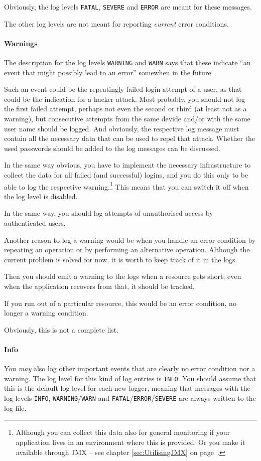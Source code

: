 \documentclass[11pt,a4paper, titlepage, parskip=half, headsepline, footsepline, cleardoublepage=current, headheight=1cm]{scrbook}
\newcommand*{\tqvref}[1]{\hyperref[{#1}]{\ref*{#1}} on page~\pageref{#1}}
\begin{document}
Obviously, the log levels \verb#FATAL#, \verb#SEVERE# and \verb#ERROR# are meant for these messages.

The other log levels are not meant for reporting \textit{current} error conditions.

\paragraph{Warnings} The description for the log levels \verb#WARNING# and \verb#WARN# says that these indicate “an event that might possibly lead to an error” somewhen in the future.

Such an event could be the repeatingly failed login attempt of a user, as that could be the indication for a hacker attack. Most probably, you should not log the first failed attempt, perhaps not even the second or third (at least not as a warning), but consecutive attempts from the same devide and/or with the same user name should be logged. And obviously, the respective log message must contain all the necessary data that can be used to repel that attack. Whether the used passwords should be added to the log messages can be discussed.

In the same way obvious, you have to implement the necessary infrastructure to collect the data for all failed (and successful) logins, and you do this only to be able to log the respective warning.\footnote{Although you can collect this data also for general monitoring if your application lives in an environment where this is provided. Or you make it available through JMX – see chapter \tqvref{sec:UtilisingJMX}.} This means that you can switch it off when the log level is disabled.

In the same way, you should log attempts of unauthorised access by authenticated users.

Another reason to log a warning would be when you handle an error condition by repeating an operation or by performing an alternative operation. Although the current problem is solved for now, it is worth to keep track of it in the logs.

Then you should emit a warning to the logs when a resource gets short; even when the application recovers from that, it should be tracked.

If you run out of a particular resource, this would be an error condition, no longer a warning condition.

Obviously, this is not a complete list.

\paragraph{Info} You \textit{may} also log other important events that are clearly no error condition nor a warning. The log level for this kind of log entries is \verb#INFO#. You should assume that this is the default log level for each new logger, meaning that messages with the log levels \verb#INFO#, \verb#WARNING#/\verb#WARN# and \verb#FATAL#/\verb#ERROR#/\verb#SEVERE# are always written to the log file.
\end{document}
